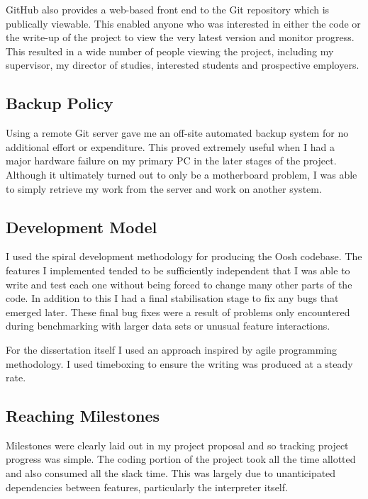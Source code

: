 \documentclass[12pt,twoside,notitlepage]{report}
\begin{document}
GitHub also provides a web-based front end to the Git repository which
is publically viewable. This enabled anyone who was interested in
either the code or the write-up of the project to view the very latest
version and monitor progress. This resulted in a wide number of people
viewing the project, including my supervisor, my director of studies,
interested students and prospective employers.

\subsection{Backup Policy}

Using a remote Git server gave me an off-site automated backup system
for no additional effort or expenditure. This proved extremely useful
when I had a major hardware failure on my primary PC in the later
stages of the project. Although it ultimately turned out to only be a
motherboard problem, I was able to simply retrieve my work from the
server and work on another system.

\subsection{Development Model}

I used the spiral development methodology for producing the Oosh
codebase. The features I implemented tended to be sufficiently
independent that I was able to write and test each one without being
forced to change many other parts of the code. In addition to this I
had a final stabilisation stage to fix any bugs that emerged
later. These final bug fixes were a result of problems only
encountered during benchmarking with larger data sets or unusual
feature interactions.

For the dissertation itself I used an approach inspired by agile
programming methodology. I used timeboxing to ensure the writing was
produced at a steady rate.

\subsection{Reaching Milestones}

Milestones were clearly laid out in my project proposal and so
tracking project progress was simple. The coding portion of the
project took all the time allotted and also consumed all the slack
time. This was largely due to unanticipated dependencies between
features, particularly the interpreter itself.
\end{document}

